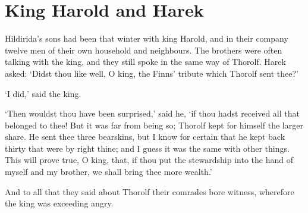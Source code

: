 \chapter{King Harold and Harek}
Hildirida's sons had been that winter with king Harold, and in their company twelve men of their own household and neighbours. The brothers were often talking with the king, and they still spoke in the same way of Thorolf. Harek asked: `Didst thou like well, O king, the Finns' tribute which Thorolf sent thee?'

`I did,' said the king.

`Then wouldst thou have been surprised,' said he, `if thou hadst received all that belonged to thee! But it was far from being so; Thorolf kept for himself the larger share. He sent thee three bearskins, but I know for certain that he kept back thirty that were by right thine; and I guess it was the same with other things. This will prove true, O king, that, if thou put the stewardship into the hand of myself and my brother, we shall bring thee more wealth.'

And to all that they said about Thorolf their comrades bore witness, wherefore the king was exceeding angry.
